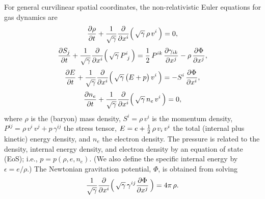 \documentclass[10pt,preprint]{aastex}
\begin{document}
For general curvilinear spatial coordinates, the non-relativistic Euler equations for gas dynamics are \citep[][see, e.g., \citet{} and references therein for a fully general relativistic treatment]{leveque_2002}
\begin{equation}
  \frac{\partial \rho}{\partial t}
  +\frac{1}{\sqrt{\gamma}}\frac{\partial }{\partial x^{i}}\Big(\,\sqrt{\gamma}\,\rho\,v^{i}\,\Big)=0,
  \label{eq:massConservation}
\end{equation}
\begin{equation}
  \frac{\partial S_{j}}{\partial t}
  +\frac{1}{\sqrt{\gamma}}\frac{\partial }{\partial x^{i}}\Big(\,\sqrt{\gamma}\,P^{i}_{~j}\,\Big)
  =\frac{1}{2}\,P^{ik}\,\frac{\partial \gamma_{ik}}{\partial x^{j}}-\rho\,\frac{\partial \Phi}{\partial x^{j}},
  \label{eq:momentumConservation}
\end{equation}
\begin{equation}
  \frac{\partial E}{\partial t}
  +\frac{1}{\sqrt{\gamma}}\frac{\partial }{\partial x^{i}}\Big(\,\sqrt{\gamma}\,\big(E+p\big)\,v^{i}\,\Big)
  =-S^{i}\,\frac{\partial \Phi}{\partial x^{i}},
  \label{eq:energyConservation}
\end{equation}
\begin{equation}
  \frac{\partial n_{e}}{\partial t}
  +\frac{1}{\sqrt{\gamma}}\frac{\partial }{\partial x^{i}}\Big(\,\sqrt{\gamma}\,n_{e}\,v^{i}\,\Big)=0,
  \label{eq:electronConservation}
\end{equation}
where $\rho$ is the (baryon) mass density, $S^{i}=\rho\,v^{i}$ is the momentum density, $P^{ij}=\rho\,v^{i}\,v^{j}+p\,\gamma^{ij}$ the stress tensor, $E=e+\frac{1}{2}\,\rho\,v_{i}\,v^{i}$ the total (internal plus kinetic) energy density, and $n_{e}$ the electron density.  
The pressure is related to the density, internal energy density, and electron density by an equation of state (EoS); i.e., $p=p(\rho,e,n_{e})$.  
(We also define the specific internal energy by $\epsilon=e/\rho$.)
The Newtonian gravitation potential, $\Phi$, is obtained from solving
\begin{equation}
  \frac{1}{\sqrt{\gamma}}\frac{\partial }{\partial x^{i}}\Big(\,\sqrt{\gamma}\,\gamma^{ij}\frac{\partial \Phi}{\partial x^{j}}\,\Big)=4\pi\,\rho.  
  \label{eq:poisson}
\end{equation}
\end{document}

